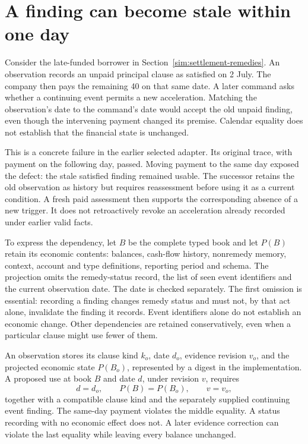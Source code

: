 \section{A finding can become stale within one day}
\label{sim:remedy-freshness}

Consider the late-funded borrower in Section~\ref{sim:settlement-remedies}.
An observation records an unpaid principal clause as satisfied on 2 July.
The company then pays the remaining 40 on that same date. A later command
asks whether a continuing event permits a new acceleration. Matching the
observation's date to the command's date would accept the old unpaid finding,
even though the intervening payment changed its premise. Calendar equality
does not establish that the financial state is unchanged.

This is a concrete failure in the earlier selected adapter. Its original
trace, with payment on the following day, passed. Moving payment to the same
day exposed the defect: the stale satisfied finding remained usable. The
successor retains the old observation as history but requires reassessment
before using it as a current condition. A fresh paid assessment then supports
the corresponding absence of a new trigger. It does not retroactively revoke
an acceleration already recorded under earlier valid facts.

To express the dependency, let $B$ be the complete typed book and let $P(B)$
retain its economic contents: balances, cash-flow history, nonremedy memory,
context, account and type definitions, reporting period and schema. The
projection omits the remedy-status record, the list of seen event identifiers
and the current observation date. The date is checked separately. The first
omission is essential: recording a finding changes remedy status and must
not, by that act alone, invalidate the finding it records. Event identifiers
alone do not establish an economic change. Other dependencies are retained
conservatively, even when a particular clause might use fewer of them.

An observation stores its clause kind $k_o$, date $d_o$, evidence revision
$v_o$, and the projected economic state $P(B_o)$, represented by a digest in
the implementation. A proposed use at book $B$ and date $d$, under revision
$v$, requires
\begin{equation}
 d=d_o,\qquad P(B)=P(B_o),\qquad v=v_o,
 \label{sim:remedy-observation-dependency}
\end{equation}
together with a compatible clause kind and the separately supplied continuing
event finding. The same-day payment violates the middle equality. A status
recording with no economic effect does not. A later evidence correction can
violate the last equality while leaving every balance unchanged.

